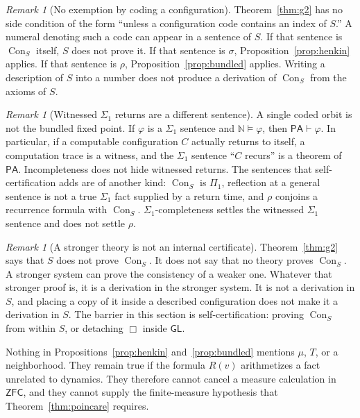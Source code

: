 \documentclass[11pt]{article}
\newcommand{\Nat}{\mathbb{N}}
\DeclareMathOperator{\Con}{Con}
\newcommand{\PA}{\mathsf{PA}}
\newcommand{\ZFC}{\mathsf{ZFC}}
\newcommand{\GL}{\mathsf{GL}}
\theoremstyle{definition}
\theoremstyle{remark}
\newtheorem{remark}[theorem]{Remark}
\begin{document}
\begin{remark}[No exemption by coding a configuration]
\label{rem:no-exemption}
Theorem~\ref{thm:g2} has no side condition of the form ``unless a configuration code contains an index of \(S\).''
A numeral denoting such a code can appear in a sentence of \(S\).
If that sentence is \(\Con_{S}\) itself, \(S\) does not prove it.
If that sentence is \(\sigma\), Proposition~\ref{prop:henkin} applies.
If that sentence is \(\rho\), Proposition~\ref{prop:bundled} applies.
Writing a description of \(S\) into a number does not produce a derivation of \(\Con_{S}\) from the axioms of \(S\).
\end{remark}

\begin{remark}[Witnessed \(\Sigma_1\) returns are a different sentence]
\label{rem:sigma1}
A single coded orbit is not the bundled fixed point.
If \(\varphi\) is a \(\Sigma_1\) sentence and \(\Nat\models\varphi\), then \(\PA\vdash\varphi\).
In particular, if a computable configuration \(C\) actually returns to itself, a computation trace is a witness, and the \(\Sigma_1\) sentence ``\(C\) recurs'' is a theorem of \(\PA\).
Incompleteness does not hide witnessed returns.
The sentences that self-certification adds are of another kind: \(\Con_{S}\) is \(\Pi_1\), reflection at a general sentence is not a true \(\Sigma_1\) fact supplied by a return time, and \(\rho\) conjoins a recurrence formula with \(\Con_{S}\).
\(\Sigma_1\)-completeness settles the witnessed \(\Sigma_1\) sentence and does not settle \(\rho\).
\end{remark}

\begin{remark}[A stronger theory is not an internal certificate]
\label{rem:gentzen}
Theorem~\ref{thm:g2} says that \(S\) does not prove \(\Con_{S}\).
It does not say that no theory proves \(\Con_{S}\).
A stronger system can prove the consistency of a weaker one.
Whatever that stronger proof is, it is a derivation in the stronger system.
It is not a derivation in \(S\), and placing a copy of it inside a described configuration does not make it a derivation in \(S\).
The barrier in this section is self-certification: proving \(\Con_{S}\) from within \(S\), or detaching \(\Box\) inside \(\GL\).
\end{remark}

Nothing in Propositions~\ref{prop:henkin} and~\ref{prop:bundled} mentions \(\mu\), \(T\), or a neighborhood.
They remain true if the formula \(R(v)\) arithmetizes a fact unrelated to dynamics.
They therefore cannot cancel a measure calculation in \(\ZFC\), and they cannot supply the finite-measure hypothesis that Theorem~\ref{thm:poincare} requires.
\end{document}
